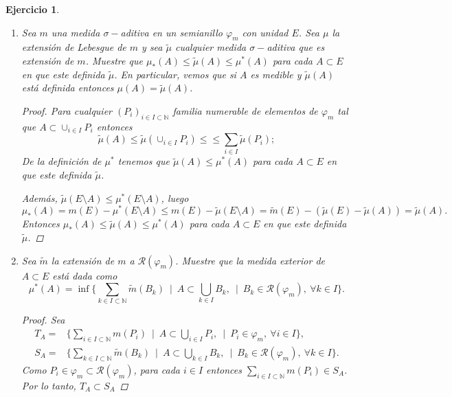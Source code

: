 \documentclass[twoside,12pt,a4 paper,openright]{book}
\newtheorem{ejer}[claim]{Ejercicio}
\begin{document}
\begin{ejer} 
   {}\
   \begin{enumerate}
       \item Sea $m$ una medida $\sigma-$aditiva en un semianillo $\varphi_m$  con unidad $E$. Sea $\mu$ la extensi\'on de Lebesgue de $m$ y sea $\tilde{\mu}$ cualquier medida $\sigma-$aditiva que es extensi\'on de $m$. Muestre que  $\mu_*(A)\leq \tilde{\mu}(A)\leq \mu^*(A) $ para cada $A\subset E$   en que este definida $\tilde{\mu}$. En particular, vemos que si  $A$ es medible y $\tilde{\mu}(A)$ est\'a definida entonces   $\mu(A) = \tilde{\mu}(A)$. 
\begin{proof}
Para cualquier $(P_i)_{i\in I \subset \mathbb N} $  
familia numerable de elementos de  $\varphi_m$ tal que 
$A \subset \cup_{i\in I} P_i  $ entonces $$\tilde {\mu} (A) \leq \tilde {\mu}( \cup_{i\in I} P_i )\leq \leq \sum_{i\in I} \tilde {\mu}(  P_i ) ;$$
De la definici\'on de $\mu^*$ tenemos que $\tilde {\mu} (A)\leq \mu^*(A)$  para cada $A\subset E$   en que este definida $\tilde{\mu}$.

\noindent
Adem\'as,  $ \tilde {\mu} (E\setminus A)\leq \mu^*(E\setminus A) $, luego  
$$ \mu_*(A) =  m  (E)-  \mu^*(E\setminus A) \leq m  (E) - \tilde {\mu} (E\setminus A) = \tilde{m}  (E) - \left( \tilde {\mu} (E) -  \tilde {\mu}  (A)\right) = 
\tilde {\mu}  (A). $$
Entonces 
$\mu_*(A)\leq \tilde{\mu}(A)\leq \mu^*(A) $ para cada $A\subset E$   en que este definida $\tilde{\mu}$.


\end{proof}



       \item Sea $\tilde{m}$ la extensi\'on de $m$ a $\mathcal{R}(\varphi_m)$. Muestre que la medida exterior de $A\subset E$ est\'a dada como 
       $$\mu^*(A) = \displaystyle \inf \{  \sum_{k\in I \subset \mathbb N} \tilde{m}(B_k) \ \mid \   A\subset\bigcup_{k\in I  } B_k , \ \mid \ B_k\in  \mathcal{R}(\varphi_m), \ \forall k\in I \}.$$
  \begin{proof}Sea 
  \begin{align*}
T_A= &       \{  \sum_{i\in I \subset \mathbb N}  {m}(P_i) \ \mid \   A\subset\bigcup_{i\in I  } P_i , \ \mid \ P_i\in  \varphi_m , \ \forall i\in I \}  , \\
S_A =  &      \{  \sum_{k\in I \subset \mathbb N} \tilde{m}(B_k) \ \mid \   A\subset\bigcup_{k\in I  } B_k , \ \mid \ B_k\in  \mathcal{R}(\varphi_m), \ \forall k\in I \}.
  \end{align*} 
  Como    
   $ P_i\in  \varphi_m \subset  \mathcal{R}(\varphi_m) $,  para cada  $ i\in I$ entonces 
   $\displaystyle \sum_{i\in I \subset \mathbb N}  {m}(P_i)\in S_A$. Por lo tanto, $T_A\subset S_A$ 
   

\end{proof}
\end{enumerate}
\end{ejer}
\end{document}
